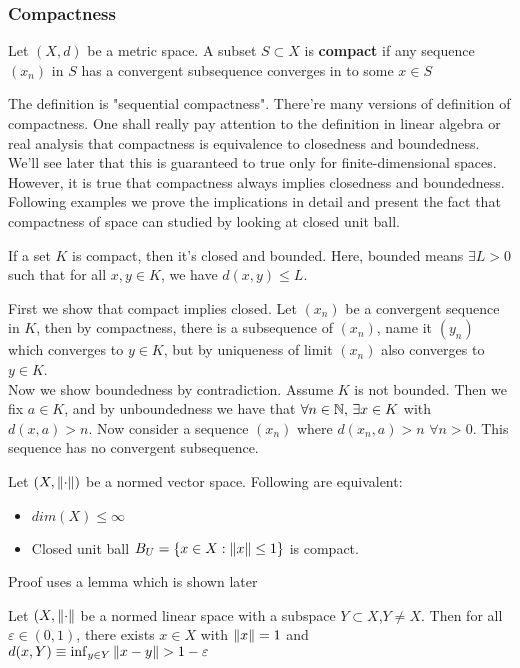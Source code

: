 \subsubsection{Compactness}
\begin{definition}[Compactness]\label{compactness}\rm\nextline
	Let $(X,d)$ be a metric space. A subset $S\subset X$ is {\bf compact} if any sequence $(x_n)$ in $S$ has a convergent subsequence converges in to some $x\in S$
\end{definition}


\begin{remark}\rm\nextline
	The definition is "sequential compactness". There're many versions of definition of compactness. One shall really pay attention to the definition in linear algebra or real analysis that compactness is equivalence to closedness and boundedness. We'll see later that this is guaranteed to true only for finite-dimensional spaces. However, it is true that compactness always implies closedness and boundedness. Following examples we prove the implications in detail and present the fact that compactness of space can studied by looking at closed unit ball.
\end{remark}


\begin{proposition}\rm\nextline
	If a set $K$ is compact, then it's closed and bounded. Here, bounded means $\exists L>0$ such that for all $x,y\in K$, we have $d(x,y)\leq L$.
	\begin{pf}{}{}
		First we show that compact implies closed. Let $(x_n)$ be a convergent sequence in $K$, then by compactness, there is a subsequence of $(x_n)$, name it $(y_n)$ which converges to $y\in K$, but by uniqueness of limit $(x_n)$ also converges to $y\in K$.\\
		Now we show boundedness by contradiction. Assume $K$ is not bounded. Then we fix $a\in K$, and by unboundedness we have that $\forall n\in \mathbb{N},\,\exists x\in K$ with $d(x,a)>n$. Now consider a sequence $(x_n)$ where  $d(x_n,a)>n$ $\forall n>0$. This sequence has no convergent subsequence.
	\end{pf}
\end{proposition}


\begin{theorem}[F.Riesz]\label{compact unit balls}\rm\nextline
	Let $(X,\left\|{\cdot}\right\|)$ be a normed vector space. Following are equivalent:
	\begin{itemize}
		\item $dim(X)\leq\infty$
		\item Closed unit ball $B_U=\{x\in X:\left\|{x}\right\|\leq 1\}$ is compact.
	\end{itemize}
	\prf Proof uses a lemma which is shown later\placeholder
\end{theorem}

\begin{lemma}[F.Riesz]\rm\nextline
	Let $(X,\left\|{\cdot}\right\|$ be a normed linear space with a subspace $Y\subset X$,$Y\neq X$.
	Then for all $\varepsilon\in(0,1)$, there exists $x\in X$ with $\left\|{x}\right\|=1$ and $d(x,Y)\equiv\inf_{y\in Y} \norm{x-y}>1-\varepsilon$
	\prf \placeholder
\end{lemma}


